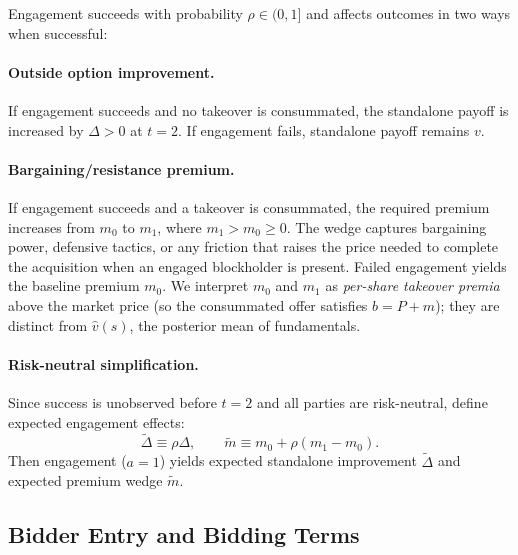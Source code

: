 \documentclass[11pt]{article}
\newcommand{\1}{\mathbf{1}}
\begin{document}
Engagement succeeds with probability $\rho \in (0,1]$ and affects outcomes in two ways when successful:

\paragraph{Outside option improvement.} If engagement succeeds and no takeover is consummated, the standalone payoff is increased by $\Delta > 0$ at $t=2$. If engagement fails, standalone payoff remains $v$.

\paragraph{Bargaining/resistance premium.} If engagement succeeds and a takeover is consummated, the required premium increases from $m_0$ to $m_1$, where $m_1 > m_0 \geq 0$. The wedge captures bargaining power, defensive tactics, or any friction that raises the price needed to complete the acquisition when an engaged blockholder is present. Failed engagement yields the baseline premium $m_0$.
We interpret $m_0$ and $m_1$ as \emph{per-share takeover premia} above the market price (so the consummated offer satisfies $b=P+m$); they are distinct from $\hat{v}(s)$, the posterior mean of fundamentals.

\paragraph{Risk-neutral simplification.} Since success is unobserved before $t=2$ and all parties are risk-neutral, define expected engagement effects:
\[
\tilde{\Delta} \equiv \rho \Delta, \qquad \tilde{m} \equiv m_0 + \rho(m_1 - m_0).
\]
Then engagement ($a=1$) yields expected standalone improvement $\tilde{\Delta}$ and expected premium wedge $\tilde{m}$.

\subsection{Bidder Entry and Bidding Terms}
\end{document}
